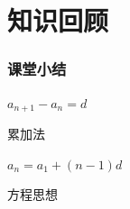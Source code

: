 \documentclass[12pt]{beamer}
\begin{document}

			
		



	
	    	





		 



\section{知识回顾}

	\begin{frame}\frametitle{课堂小结}
	    
		\begin{description}[<+-|alert@+>]
			\item[一个定义] $a_{n+1}-a_n=d$
			\item[一个方法] 累加法
			\item[一个公式] $a_n=a_1+(n-1)d$
			\item[一个思想] 方程思想
		\end{description}
	
	\end{frame}
\end{document}
